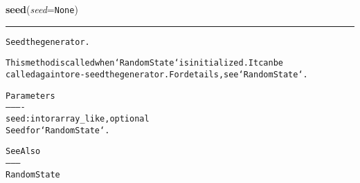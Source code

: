     \label{QSTK:qstklearn:mldiagnostics:seed}

    \vspace{0.5ex}

\hspace{.8\funcindent}\begin{boxedminipage}{\funcwidth}

    \raggedright \textbf{seed}(\textit{seed}={\tt None})

    \vspace{-1.5ex}

    \rule{\textwidth}{0.5\fboxrule}
\setlength{\parskip}{2ex}
\begin{alltt}
Seed the generator.

This method is called when `RandomState` is initialized. It can be
called again to re-seed the generator. For details, see `RandomState`.

Parameters
----------
seed : int or array\_like, optional
    Seed for `RandomState`.

See Also
--------
RandomState
\end{alltt}

\setlength{\parskip}{1ex}
    \end{boxedminipage}

    \label{QSTK:qstklearn:mldiagnostics:set_state}

    \vspace{0.5ex}

